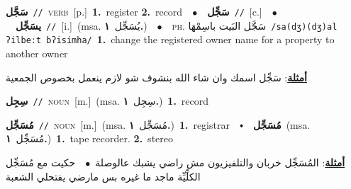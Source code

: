 \documentclass[10pt,a4paper,twoside]{article} %
\begin{document}
\begin{multicols}{2}
{\setlength\topsep{0pt}\textbf{\foreignlanguage{arabic}{سَجَّل}}\ {\color{gray}\texttt{//}\color{black}}\ \textsc{verb}\ [p.]\ \textbf{1.}~register  \textbf{2.}~record\ \ $\bullet$\ \ \setlength\topsep{0pt}\textbf{\foreignlanguage{arabic}{سَجِّل}}\ {\color{gray}\texttt{//}\color{black}}\ [c.]\ \ $\bullet$\ \ \setlength\topsep{0pt}\textbf{\foreignlanguage{arabic}{يسَجِّل}}\ {\color{gray}\texttt{//}\color{black}}\ [i.]\ \color{gray}(msa. \foreignlanguage{arabic}{يُسَجِّل}~\foreignlanguage{arabic}{\textbf{١.}})\color{black}\ \ $\bullet$\ \ \textsc{ph.} \color{gray} \foreignlanguage{arabic}{سَجَّل البَيت باسِمْهَا}\color{black}\ {\color{gray}\texttt{/{\sffamily sa(dʒ)(dʒ)al ʔilbeːt bʔisimha}/}\color{black}}\ \textbf{1.}~change the registered owner name for a property to another owner\  \begin{flushright}\color{gray}\foreignlanguage{arabic}{\textbf{\underline{\foreignlanguage{arabic}{أمثلة}}}: سَجِّل اسمك وان شاء الله بنشوف شو لازم ينعمل بخصوص الجمعية}\end{flushright}\color{black}} \vspace{2mm}

{\setlength\topsep{0pt}\textbf{\foreignlanguage{arabic}{سِجِل}}\ {\color{gray}\texttt{//}\color{black}}\ \textsc{noun}\ [m.]\ \color{gray}(msa. \foreignlanguage{arabic}{سِجِل}~\foreignlanguage{arabic}{\textbf{١.}})\color{black}\ \textbf{1.}~record\ } \vspace{2mm}

{\setlength\topsep{0pt}\textbf{\foreignlanguage{arabic}{مُسَجِّل}}\ {\color{gray}\texttt{//}\color{black}}\ \textsc{noun}\ [m.]\ \color{gray}(msa. \foreignlanguage{arabic}{مُسَجِّل}~\foreignlanguage{arabic}{\textbf{١.}})\color{black}\ \textbf{1.}~registrar\ \ $\smblkdiamond$\ \ \setlength\topsep{0pt}\textbf{\foreignlanguage{arabic}{مُسَجِّل}}\ \color{gray}(msa. \foreignlanguage{arabic}{مُسَجِّل}~\foreignlanguage{arabic}{\textbf{١.}})\color{black}\ \textbf{1.}~tape recorder.  \textbf{2.}~stereo\  \begin{flushright}\color{gray}\foreignlanguage{arabic}{\textbf{\underline{\foreignlanguage{arabic}{أمثلة}}}: المُسَجِّل خربان والتلفيزيون مش راضي يشبك عالوصلة\ $\bullet$\ \  حكيت مع مُسَجِّل الكلِّيِّة ماجد ما غيره بس مارضي يفتحلي الشعبة}\end{flushright}\color{black}} \vspace{2mm}


\end{multicols}
\end{document}
